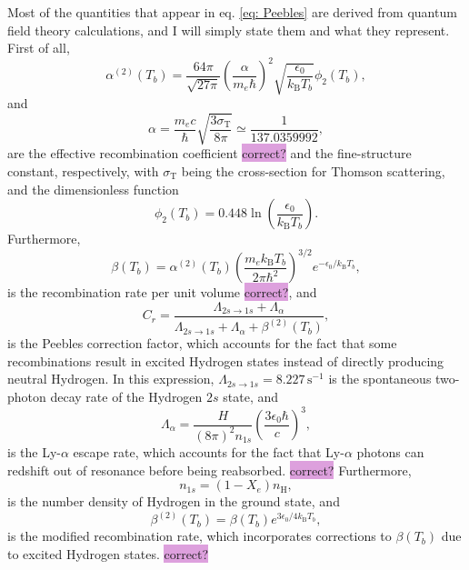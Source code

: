 \documentclass{aa}
\numberwithin{equation}{section}
\numberwithin{table}{section}
\numberwithin{figure}{section}
\begin{document}
Most of the quantities that appear in eq. \eqref{eq: Peebles} are derived from quantum field theory calculations, and I will simply state them and what they represent. First of all,
\begin{equation}
  \alpha^{(2)}(T_b) = \frac{64\pi}{\sqrt{27\pi}}\left(\frac{\alpha}{m_e\hbar}\right)^2\sqrt{\frac{\epsilon_0}{k_\text{B}T_b}}\phi_2(T_b),
\end{equation}
and
\begin{equation}
  \alpha = \frac{m_ec}{\hbar}\sqrt{\frac{3\sigma_\text{T}}{8\pi}} \simeq \frac{1}{137.0359992},
\end{equation}
are the effective recombination coefficient \colorbox{Plum}{correct?} and the fine-structure constant, respectively, with $\sigma_\text{T}$ being the cross-section for Thomson scattering, and the dimensionless function
\begin{equation}
  \phi_2(T_b) = 0.448\ln\left(\frac{\epsilon_0}{k_\text{B}T_b}\right).
\end{equation}
Furthermore,
\begin{equation}
  \beta(T_b) = \alpha^{(2)}(T_b)\left(\frac{m_ek_\text{B}T_b}{2\pi\hbar^2}\right)^{3/2}e^{-\epsilon_0/k_\text{B}T_b},
\end{equation}
is the recombination rate per unit volume \colorbox{Plum}{correct?}, and 
\begin{equation}
  C_r = \frac{\Lambda_{2s \to 1s} + \Lambda_{\alpha}}{\Lambda_{2s \to 1s} + \Lambda_{\alpha} + \beta^{(2)}(T_b)},
\end{equation}
is the Peebles correction factor, which accounts for the fact that some recombinations result in excited Hydrogen states instead of directly producing neutral Hydrogen. In this expression, $\Lambda_{2s \to 1s}=8.227\,\text{s}^{-1}$ is the spontaneous two-photon decay rate of the Hydrogen $2s$ state, and 
\begin{equation}
  \Lambda_{\alpha} = \frac{H}{(8\pi)^2n_{1s}}\left(\frac{3\epsilon_0\hbar}{c} \right)^3,
\end{equation}
is the Ly-$\alpha$ escape rate, which accounts for the fact that Ly-$\alpha$ photons can redshift out of resonance before being reabsorbed. \colorbox{Plum}{correct?} Furthermore, 
\begin{equation}
  n_{1s} = (1-X_e)n_\text{H},
\end{equation}
is the number density of Hydrogen in the ground state, and
\begin{equation}
  \beta^{(2)}(T_b) = \beta(T_b)e^{3\epsilon_0/4k_\text{B}T_b},
\end{equation}
is the modified recombination rate, which incorporates corrections to $\beta(T_b)$ due to excited Hydrogen states. \colorbox{Plum}{correct?} 
\end{document}
